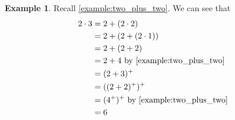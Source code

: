 \documentclass{article}
\theoremstyle{definition}
\theoremstyle{definition}
\newtheorem{example}{Example}[section]
\theoremstyle{plain}
\theoremstyle{remark}
\theoremstyle{plain}
\theoremstyle{remark}
\theoremstyle{plain}
\theoremstyle{plain}
\theoremstyle{plain}
\begin{document}
\begin{example}
  Recall \autoref{example:two_plus_two}. We can see that 
  \begin{align*}
    2 \cdot 3 &= 2 + (2 \cdot 2) \\ 
              &= 2 + (2 + (2 \cdot 1)) \\ 
              &= 2 + (2 + 2) \\ 
              &= 2 + 4 \text{ by \autoref{example:two_plus_two}} \\ 
              &= (2 + 3)^{+} \\ 
              &= ((2 + 2)^{+})^{+} \\
              &= (4^{+})^{+} \text{ by \autoref{example:two_plus_two}} \\
              &= 6
  \end{align*}
\end{example}



\end{document}
